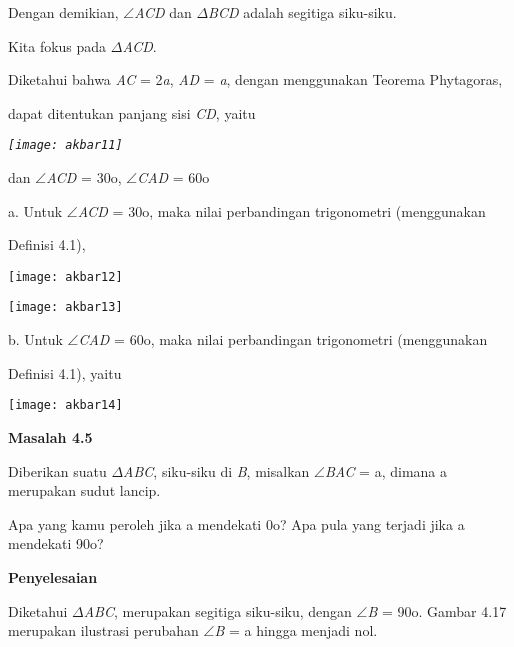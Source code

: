 \documentclass[11pt,fleqn]{book} %
\begin{document}
\begin{myEnumerate}
\begin{itemize}
\noindent 

\noindent Dengan demikian, $\mathrm{\angle }$\textit{ACD }dan $\Delta$\textit{BCD }adalah segitiga siku-siku.

\noindent Kita fokus pada $\Delta$\textit{ACD}.

\noindent Diketahui bahwa \textit{AC }= 2\textit{a}, \textit{AD }= \textit{a}, dengan menggunakan Teorema Phytagoras,

\noindent dapat ditentukan panjang sisi \textit{CD}, yaitu

\noindent 

\noindent \textit{\texttt{[image: akbar11]}}

\noindent \textit{}

\noindent dan $\mathrm{\angle }$\textit{ACD }= 30o, $\mathrm{\angle }$\textit{CAD }= 60o

\noindent 

\noindent a. Untuk $\mathrm{\angle }$\textit{ACD }= 30o, maka nilai perbandingan trigonometri (menggunakan

\noindent Definisi 4.1),

\noindent \texttt{[image: akbar12]}

\noindent \texttt{[image: akbar13]}

\noindent 

\noindent b. Untuk $\mathrm{\angle }$\textit{CAD }= 60o, maka nilai perbandingan trigonometri (menggunakan

\noindent Definisi 4.1), yaitu

\noindent 

\noindent \texttt{[image: akbar14]}

\noindent 

\noindent \textbf{Masalah 4.5}

\noindent Diberikan suatu $\Delta$\textit{ABC}, siku-siku di \textit{B}, misalkan $\mathrm{\angle }$\textit{BAC }= a, dimana a merupakan sudut lancip.

\noindent 

\noindent Apa yang kamu peroleh jika a mendekati 0o? Apa pula yang terjadi jika a mendekati 90o?

\noindent \textbf{}

\noindent \textbf{Penyelesaian}

\noindent Diketahui $\Delta$\textit{ABC}, merupakan segitiga siku-siku, dengan $\mathrm{\angle }$\textit{B }= 90o. Gambar 4.17 merupakan ilustrasi perubahan $\mathrm{\angle }$\textit{B }= a hingga menjadi nol.\textit{}


\end{itemize}
\end{myEnumerate}
\end{document}
